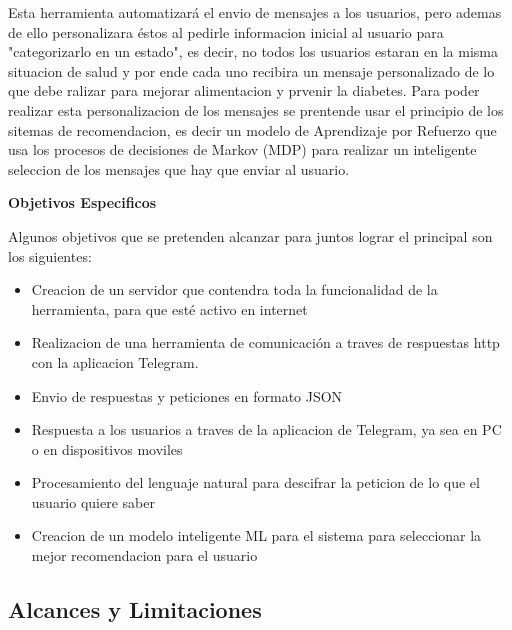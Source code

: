 Esta herramienta automatizará el envio de mensajes a los usuarios, pero ademas de ello personalizara éstos al pedirle informacion inicial al usuario para "categorizarlo en un estado", es decir, no todos los usuarios estaran en la misma situacion de salud y por ende cada uno recibira un mensaje personalizado de lo que debe ralizar para mejorar alimentacion y prvenir la diabetes. Para poder realizar esta personalizacion de los mensajes se prentende usar el principio de los sitemas de recomendacion, es decir un modelo de Aprendizaje por Refuerzo que usa los procesos de decisiones de Markov (MDP) para realizar un inteligente seleccion de los mensajes que hay que enviar al usuario.
\vspace{0.50cm}


\vspace{0.50cm}


\textbf{Objetivos Especificos}

Algunos objetivos que se pretenden alcanzar para juntos lograr el principal son los siguientes:

\begin{itemize}
    \item Creacion de un servidor que contendra toda la funcionalidad de la herramienta, para que esté activo en internet
	\item Realizacion de una herramienta de comunicación a traves de respuestas http con la aplicacion Telegram.
	\item Envio de respuestas y peticiones en formato JSON
	\item Respuesta a los usuarios a traves de la aplicacion de Telegram, ya sea en PC o en dispositivos moviles
	\item Procesamiento del lenguaje natural para descifrar la peticion de lo que el usuario quiere saber
	\item Creacion de un modelo inteligente ML para el sistema para seleccionar la mejor recomendacion para el usuario
\end{itemize}

\subsection{Alcances y Limitaciones}

